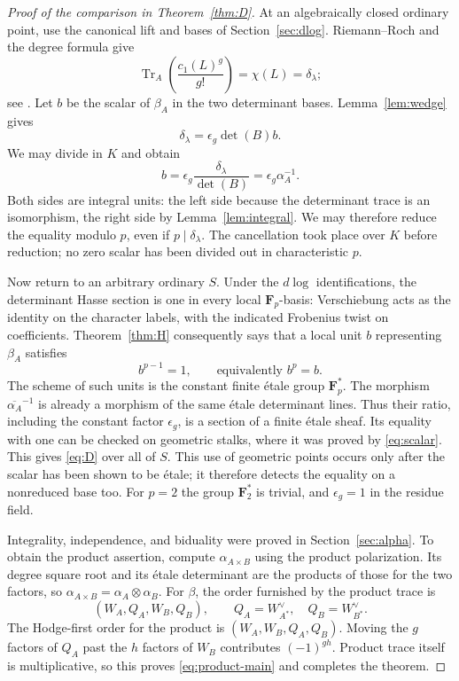 \documentclass[11pt]{article}
\theoremstyle{definition}\newtheorem{definition}[theorem]{Definition}
\theoremstyle{remark}\newtheorem{remark}[theorem]{Remark}
\newcommand{\FF}{\mathbf F}
\newcommand{\Tr}{\operatorname{Tr}}
\begin{document}
\begin{proof}[Proof of the comparison in Theorem~\ref{thm:D}]
At an algebraically closed ordinary point, use the canonical lift and bases of Section~\ref{sec:dlog}. Riemann--Roch and the degree formula give
\begin{equation}\label{eq:rr-trace}
 \Tr_A\left(\frac{c_1(L)^g}{g!}\right)
 =\chi(L)=\delta_\lambda;
\end{equation}
see \citet[Theorem~9.11 and proof, pp.~131--133]{EGM}. Let $b$ be the scalar of $\beta_A$ in the two determinant bases. Lemma~\ref{lem:wedge} gives
\[
 \delta_\lambda=\epsilon_g\det(B)b.
\]
We may divide in $K$ and obtain
\begin{equation}\label{eq:scalar}
 b=\epsilon_g\frac{\delta_\lambda}{\det(B)}
   =\epsilon_g\alpha_A^{-1}.
\end{equation}
Both sides are integral units: the left side because the determinant trace is an isomorphism, the right side by Lemma~\ref{lem:integral}. We may therefore reduce the equality modulo $p$, even if $p\mid\delta_\lambda$. The cancellation took place over $K$ before reduction; no zero scalar has been divided out in characteristic $p$.

Now return to an arbitrary ordinary $S$. Under the $d\log$ identifications, the determinant Hasse section is one in every local $\FF_p$-basis: Verschiebung acts as the identity on the character labels, with the indicated Frobenius twist on coefficients. Theorem~\ref{thm:H} consequently says that a local unit $b$ representing $\beta_A$ satisfies
\[
 b^{p-1}=1,\qquad\text{equivalently }b^p=b.
\]
The scheme of such units is the constant finite \'etale group $\FF_p^*$. The morphism $\overline{\alpha_A}^{-1}$ is already a morphism of the same \'etale determinant lines. Thus their ratio, including the constant factor $\epsilon_g$, is a section of a finite \'etale sheaf. Its equality with one can be checked on geometric stalks, where it was proved by \eqref{eq:scalar}. This gives \eqref{eq:D} over all of $S$. This use of geometric points occurs only after the scalar has been shown to be \'etale; it therefore detects the equality on a nonreduced base too. For $p=2$ the group $\FF_2^*$ is trivial, and $\epsilon_g=1$ in the residue field.

Integrality, independence, and biduality were proved in Section~\ref{sec:alpha}. To obtain the product assertion, compute $\alpha_{A\times B}$ using the product polarization. Its degree square root and its \'etale determinant are the products of those for the two factors, so $\alpha_{A\times B}=\alpha_A\otimes\alpha_B$. For $\beta$, the order furnished by the product trace is
\[
 (W_A,Q_A,W_B,Q_B),\qquad Q_A=W_{A^*}^{\vee},\quad Q_B=W_{B^*}^{\vee}.
\]
The Hodge-first order for the product is $(W_A,W_B,Q_A,Q_B)$. Moving the $g$ factors of $Q_A$ past the $h$ factors of $W_B$ contributes $(-1)^{gh}$. Product trace itself is multiplicative, so this proves \eqref{eq:product-main} and completes the theorem.
\end{proof}
\end{document}

